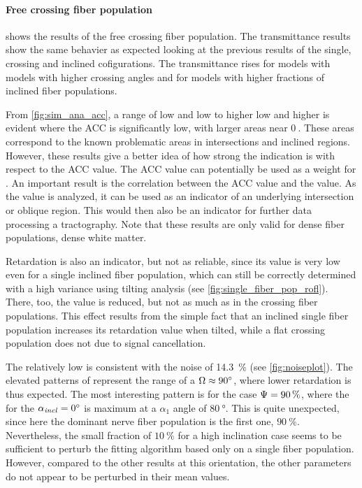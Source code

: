 \paragraph{Free crossing fiber population}
 shows the results of the free crossing fiber population.
The transmittance results show the same behavier as expected looking at the previous results of the single, crossing and inclined cofigurations.
The transmittance rises for models with models with higher crossing angles and for models with higher fractions of inclined fiber populations.
\par
%
From \ref{fig:sim_ana_acc}, a range of low \modelPsi{} and low \modelInc{} to higher low \modelPsi{} and higher \modelInc{} is evident where the \ac{ACC} is significantly low, with larger areas near $\SI{0}{}$.
These areas correspond to the known problematic areas in intersections and inclined regions.
However, these results give a better idea of how strong the indication is with respect to the \ac{ACC} value.
The \ac{ACC} value can potentially be used as a weight for .
An important result is the correlation between the \ac{ACC} value and the \trel{} value.
As the \trel{} value is analyzed, it can be used as an indicator of an underlying intersection or oblique region.
This would then also be an indicator for further data processing \eg{} a tractography.
Note that these results are only valid for dense fiber populations, \ie{} dense white matter.
\par
%
Retardation is also an indicator, but not as reliable, since its value is very low even for a single inclined fiber population, which can still be correctly determined with a high variance using tilting analysis (see \cref{fig:single_fiber_pop_rofl}).
There, too, the \trel{} value is reduced, but not as much as in the crossing fiber populations.
This effect results from the simple fact that an inclined single fiber population increases its retardation value when tilted, while a flat crossing population does not due to signal cancellation.
\par
%
The relatively low \rvalue{} is consistent with the noise of \SI{14.3}{\percent} (see \cref{fig:noiseplot}).
The elevated patterns of \rvalue{} represent the range of a $\textnormal{$\Omega$} \approx \SI{90}{\degree}$, where lower retardation is thus expected.
The most interesting pattern is for the case $\textnormal{$\Psi$} = \SI{90}{\percent}$, where the \rvalue{} for the $\textnormal{$\alpha_{\mathit{incl}}$} = \SI{0}{\degree}$ is maximum at a $\alpha_1$  angle of $\SI{80}{\degree}$.
This is quite unexpected, since here the dominant nerve fiber population is the first one, \ie{} $\SI{90}{\percent}$.
Nevertheless, the small fraction of $\SI{10}{\percent}$ for a high inclination case seems to be sufficient to perturb the fitting algorithm based only on a single fiber population.
However, compared to the other results at this orientation, the other parameters do not appear to be perturbed in their mean values.
% 
%
%
